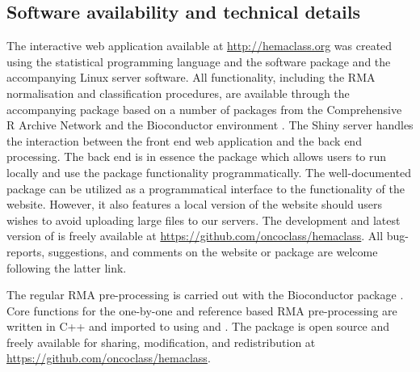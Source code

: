 \documentclass{article}
\begin{document}
\subsection{Software availability and technical details}
The interactive web application available at \url{http://hemaclass.org} was created using the statistical programming language \R{} \citep{RCoreTeam} and the software package  \citep{shiny} and the accompanying Linux server software.
All \hemaClass{} functionality, including the RMA normalisation and classification procedures, are available through the accompanying package  based on a number of packages from the Comprehensive R Archive Network \citep{RCoreTeam} and the Bioconductor environment \citep{Gentleman2004}.
The Shiny server handles the interaction between the front end web application and the back end \R{} processing.
The back end is in essence the  package which allows users to run \hemaClass{} locally and use the package functionality programmatically.
The well-documented package can be utilized as a programmatical interface to the functionality of the website.
However, it also features a local version of the website should users wishes to avoid uploading large files to our servers.
The development and latest version of  is freely available at \url{https://github.com/oncoclass/hemaclass}.
All bug-reports, suggestions, and comments on the website or package are welcome following the latter link.

The regular RMA pre-processing is carried out with the Bioconductor package  \citep{Gautier2004}.
Core functions for the one-by-one and reference based RMA pre-processing are written in \textsf{C++} and imported to \R{} using  and  \citep{Rcpp2013,Eddelbuettel2011,RcppArmadillo,Sanderson2010}.
The  package is open source and freely available for sharing, modification, and redistribution at \url{https://github.com/oncoclass/hemaclass}.
\end{document}
